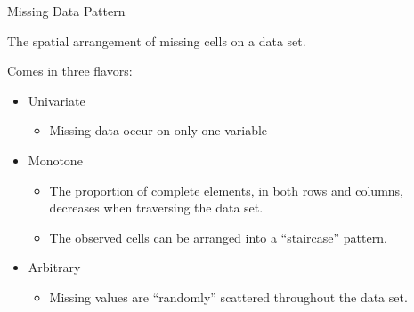 \documentclass{beamer}\usepackage[]{graphicx}\usepackage[]{color}
\begin{document}
\begin{frame}{Missing Data Pattern}
  
  The spatial arrangement of missing cells on a data set.\\
   
  \vb
  
  Comes in three flavors:
  
  \vc
  
  \begin{itemize}
  \item Univariate
    \begin{itemize}
      \item Missing data occur on only one variable
    \end{itemize}
  
    \vb
  
  \item Monotone
    \begin{itemize}
    \item The proportion of complete elements, in both rows and columns, 
      decreases when traversing the data set.
    \item The observed cells can be arranged into a ``staircase'' pattern.
    \end{itemize}
  
    \vb
  
  \item Arbitrary
    \begin{itemize}
    \item Missing values are ``randomly'' scattered throughout the data set.
    \end{itemize}
  \end{itemize}
  
\end{frame}

\watermarkoff %

\captionsetup{labelformat = empty}
\end{document}
